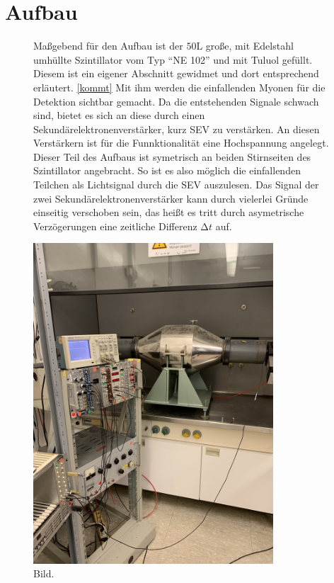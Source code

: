 \newpage
\section{Aufbau}
\begin{figure}
\begin{minipage}{0.49\textwidth}
Maßgebend für den Aufbau ist der $50 \si{\liter}$ große, mit Edelstahl umhüllte Szintillator vom Typ \enquote{NE 102} und mit Tuluol gefüllt. Diesem ist ein eigener Abschnitt gewidmet und dort entsprechend erläutert. \ref{kommt}
Mit ihm werden die einfallenden Myonen für die Detektion sichtbar gemacht. Da die entstehenden Signale schwach sind, bietet es sich an diese durch einen Sekundärelektronenverstärker, kurz SEV zu verstärken. An diesen Verstärkern ist für
die Funnktionalität eine Hochspannung angelegt. Dieser Teil des Aufbaus ist symetrisch an beiden Stirnseiten des Szintillator angebracht. So ist es also möglich die einfallenden Teilchen als Lichtsignal durch die SEV auszulesen.
Das Signal der zwei Sekundärelektronenverstärker kann durch vielerlei Gründe einseitig verschoben sein, das heißt es tritt durch asymetrische Verzögerungen eine zeitliche Differenz $\increment t$ auf.
\end{minipage}%
\begin{minipage}[h]{0.49\textwidth}
    \centering
    \includegraphics[width=0.8\textwidth]{bilder/bild2.png}
    \caption{Bild. 
            }
\end{minipage}
\end{figure}
